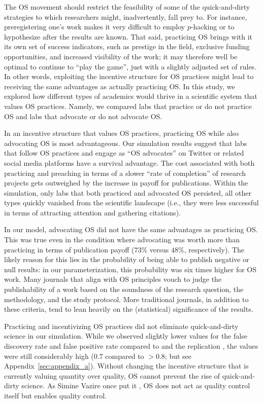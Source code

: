 \documentclass[meta, authordate]{jote-new-article}
\begin{document}
The OS movement should restrict the feasibility of some of the quick-and-dirty strategies to which researchers might, inadvertently, fall prey to. For instance, preregistering one's work makes it very difficult to employ $p$-hacking or to hypothesize after the results are known. That said, practicing OS brings with it its own set of success indicators, such as prestige in the field, exclusive funding opportunities, and increased visibility of the work; it may therefore well be optimal to continue to ``play the game'', just with a slightly adjusted set of rules. In other words, exploiting the incentive structure for OS practices might lead to receiving the same advantages as actually practicing OS. In this study, we explored how different types of academics would thrive in a scientific system that values OS practices. Namely, we compared labs that practice or do not practice OS and labs that advocate or do not advocate OS.

In an incentive structure that values OS practices, practicing OS while also advocating OS is most advantageous. Our simulation results suggest that labs that follow OS practices and engage as ``OS advocates'' on Twitter or related social media platforms have a survival advantage. The cost associated with both practicing and preaching in terms of a slower ``rate of completion'' of research projects gets outweighed by the increase in payoff for publications. Within the simulation, only labs that both practiced and advocated OS persisted, all other types quickly vanished from the scientific landscape (i.e., they were less successful in terms of attracting attention and gathering citations).

In our model, advocating OS did not have the same advantages as practicing OS. This was true even in the condition where advocating was worth more than practicing in terms of publication payoff ($73\%$ versus $48\%$, respectively). The likely reason for this lies in the probability of being able to publish negative or null results: in our parameterization, this probability was six times higher for OS work. Many journals that align with OS principles vouch to judge the publishability of a work based on the soundness of the research question, the methodology, and the study protocol. More traditional journals, in addition to these criteria, tend to lean heavily on the (statistical) significance of the results.

Practicing and incentivizing OS practices did not eliminate quick-and-dirty science in our simulation. While we observed slightly lower values for the false discovery rate and false positive rate compared to \textcite{SmaldinoMcelreath2016} and the replication \parencite{KohrtSmaldinoMcelreath_2022preprint}, the values were still considerably high ($0.7$ compared to $>0.8$; but see Appendix~\ref{sec:appendix_a}). Without changing the incentive structure that is currently valuing quantity over quality, OS cannot prevent the rise of quick-and-dirty science. As Simine Vazire once put it \parencite{vazire_open_2020}, OS does not act as quality control itself but enables quality control.
\end{document}
